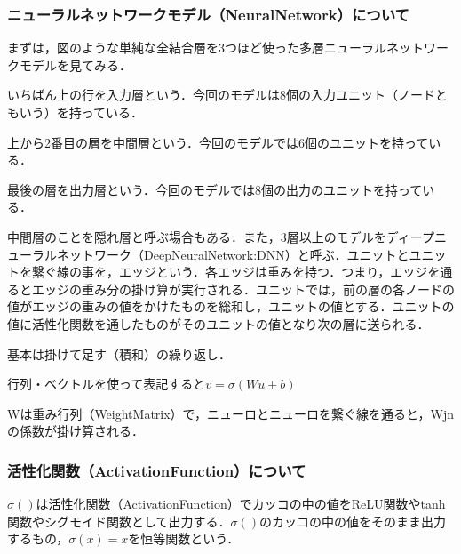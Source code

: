 \documentclass[uplatex,titlepage]{jsarticle}
\newif\iffigure
\begin{document}
\subsubsection{ニューラルネットワークモデル（NeuralNetwork）について}
まずは，図のような単純な全結合層を3つほど使った多層ニューラルネットワークモデルを見てみる．\par
いちばん上の行を入力層という．今回のモデルは8個の入力ユニット（ノードともいう）を持っている．\par
上から2番目の層を中間層という．今回のモデルでは6個のユニットを持っている．\par
最後の層を出力層という．今回のモデルでは8個の出力のユニットを持っている．\par
中間層のことを隠れ層と呼ぶ場合もある．また，3層以上のモデルをディープニューラルネットワーク（DeepNeuralNetwork:DNN）と呼ぶ．ユニットとユニットを繋ぐ線の事を，エッジという．各エッジは重みを持つ．つまり，エッジを通るとエッジの重み分の掛け算が実行される．ユニットでは，前の層の各ノードの値がエッジの重みの値をかけたものを総和し，ユニットの値とする．ユニットの値に活性化関数を通したものがそのユニットの値となり次の層に送られる．
\iffigure
\begin{figure}[H]%
    \begin{center}
    \texttt{[image: deep\_learning\_model.png]} 
    \caption{多層ニューラルネットワークモデル}
    \end{center}
\end{figure}
\fi
基本は掛けて足す（積和）の繰り返し．\par
行列・ベクトルを使って表記すると$v=\sigma(Wu+b)$\par
Wは重み行列（WeightMatrix）で，ニューロとニューロを繋ぐ線を通ると，Wjnの係数が掛け算される．

\subsubsection{活性化関数（ActivationFunction）について}
$\sigma()$は活性化関数（ActivationFunction）でカッコの中の値をReLU関数やtanh関数やシグモイド関数として出力する．$\sigma()$のカッコの中の値をそのまま出力するもの，$\sigma(x)=x$を恒等関数という．
\iffigure
\begin{figure}[H]%
    \begin{center}
    \texttt{[image: actication\_function.png]} 
    \caption{活性化関数}
    \end{center}
\end{figure}
\fi
\end{document}
